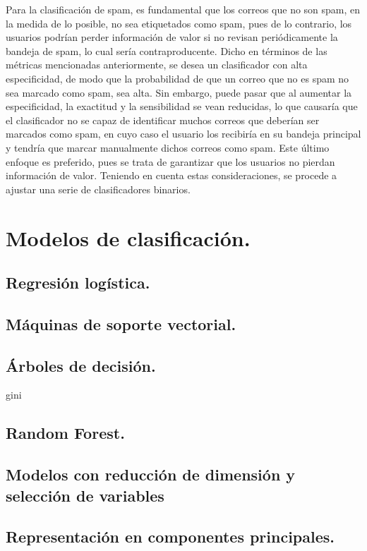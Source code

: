 \documentclass[12pt, letterpaper]{article}
\begin{document}
Para la clasificación de spam, es fundamental que los correos que no son spam, en la medida de lo posible, no sea etiquetados como spam, pues de lo contrario, los usuarios podrían perder información de valor si no revisan periódicamente la bandeja de spam, lo cual sería contraproducente. Dicho en términos de las métricas mencionadas anteriormente, se desea un clasificador con alta especificidad, de modo que la probabilidad de que un correo que no es spam no sea marcado como spam, sea alta. Sin embargo, puede pasar que al aumentar la especificidad, la exactitud y la sensibilidad se vean reducidas, lo que causaría que el clasificador no se capaz de identificar muchos correos que deberían ser marcados como spam, en cuyo caso el usuario los recibiría en su bandeja principal y tendría que marcar manualmente dichos correos como spam. Este último enfoque es preferido, pues se trata de garantizar que los usuarios no pierdan información de valor. Teniendo en cuenta estas consideraciones, se procede a ajustar una serie de clasificadores binarios.


\section{Modelos de clasificación.}

\subsection{Regresión logística.}

\subsection{Máquinas de soporte vectorial.}

\subsection{Árboles de decisión.}
gini

\subsection{Random Forest.}

\subsection{Modelos con reducción de dimensión y selección de variables}

\subsection{Representación en componentes principales.}
\end{document}
